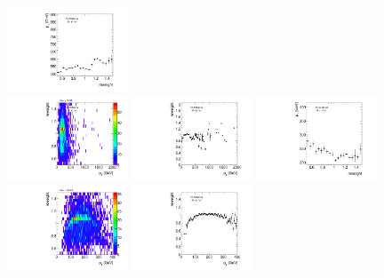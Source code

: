 \begin{figure}[htbp!]
\begin{center}
\includegraphics[width=0.32\textwidth,angle=-90]{figures/boosted/AppendixReweight/Weights/3Trk_Signal_leadHCand_Pt_m_weight_profy.pdf}\\
\includegraphics[width=0.32\textwidth,angle=-90]{figures/boosted/AppendixReweight/Weights/3Trk_Signal_leadHCand_trk0_Pt_weight.pdf}
\includegraphics[width=0.32\textwidth,angle=-90]{figures/boosted/AppendixReweight/Weights/3Trk_Signal_leadHCand_trk0_Pt_weight_profx.pdf}
\includegraphics[width=0.32\textwidth,angle=-90]{figures/boosted/AppendixReweight/Weights/3Trk_Signal_leadHCand_trk0_Pt_weight_profy.pdf}\\
\includegraphics[width=0.32\textwidth,angle=-90]{figures/boosted/AppendixReweight/Weights/3Trk_Signal_sublHCand_trk0_Pt_weight.pdf}
\includegraphics[width=0.32\textwidth,angle=-90]{figures/boosted/AppendixReweight/Weights/3Trk_Signal_sublHCand_trk0_Pt_weight_profx.pdf}

\end{center}
\end{figure}
